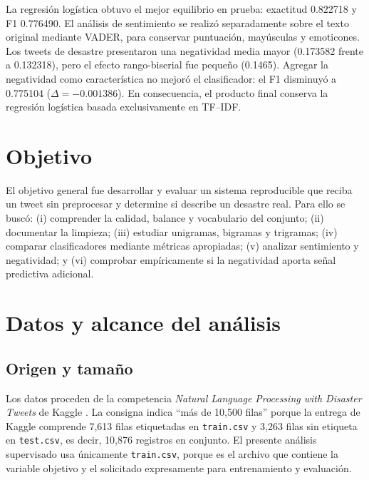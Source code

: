 \documentclass[11pt,letterpaper]{article}
\newcommand{\code}[1]{\texttt{#1}}
\begin{document}
La regresión logística obtuvo el mejor equilibrio en prueba: exactitud 0.822718 y F1 0.776490. El análisis de sentimiento se realizó separadamente sobre el texto original mediante VADER, para conservar puntuación, mayúsculas y emoticones. Los tweets de desastre presentaron una negatividad media mayor (0.173582 frente a 0.132318), pero el efecto rango-biserial fue pequeño (0.1465). Agregar la negatividad como característica no mejoró el clasificador: el F1 disminuyó a 0.775104 ($\Delta=-0.001386$). En consecuencia, el producto final conserva la regresión logística basada exclusivamente en TF--IDF.

\section{Objetivo}

El objetivo general fue desarrollar y evaluar un sistema reproducible que reciba un tweet sin preprocesar y determine si describe un desastre real. Para ello se buscó: (i) comprender la calidad, balance y vocabulario del conjunto; (ii) documentar la limpieza; (iii) estudiar unigramas, bigramas y trigramas; (iv) comparar clasificadores mediante métricas apropiadas; (v) analizar sentimiento y negatividad; y (vi) comprobar empíricamente si la negatividad aporta señal predictiva adicional.

\section{Datos y alcance del análisis}

\subsection{Origen y tamaño}

Los datos proceden de la competencia \emph{Natural Language Processing with Disaster Tweets} de Kaggle \cite{kaggle}. La consigna indica ``más de 10,500 filas'' porque la entrega de Kaggle comprende 7,613 filas etiquetadas en \code{train.csv} y 3,263 filas sin etiqueta en \code{test.csv}, es decir, 10,876 registros en conjunto. El presente análisis supervisado usa únicamente \code{train.csv}, porque es el archivo que contiene la variable objetivo y el solicitado expresamente para entrenamiento y evaluación.
\end{document}
